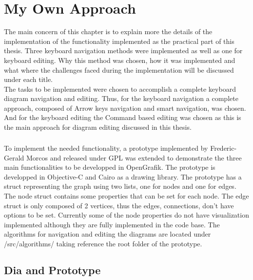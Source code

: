 \chapter{My Own Approach}
\beginchapter
The main concern of this chapter is to explain more the details of the implementation of the functionality implemented as the practical part of this thesis. Three keyboard navigation methods were implemented as well as one for keyboard editing. Why this method was chosen, how it was implemented and what where the challenges faced during the implementation will be discussed under each title.\\
The tasks to be implemented were chosen to accomplish a complete keyboard diagram navigation and editing. Thus, for the keyboard navigation a complete approach, composed of Arrow keys navigation and smart navigation, was chosen. And for the keyboard editing the Command based editing was chosen as this is the main approach for diagram editing discussed in this thesis.

\paragraph{}
To implement the needed functionality, a prototype implemented by Frederic-Gerald Morcos and released under GPL was extended to demonstrate the three main functionalities to be developped in OpenGrafik. The prototype is developped in Objective-C and Cairo as a drawing library. The prototype has a struct representing the graph using two lists, one for nodes and one for edges. The node struct contains some properties that can be set for each node. The edge struct is only composed of 2 vertices, thus the edges, connections, don't have options to be set. Currently some of the node properties do not have visualization implemented although they are fully implemented in the code base. The algorithms for navigation and editing the diagrams are located under /src/algorithms/ taking reference the root folder of the prototype.

\section{Dia and Prototype}
